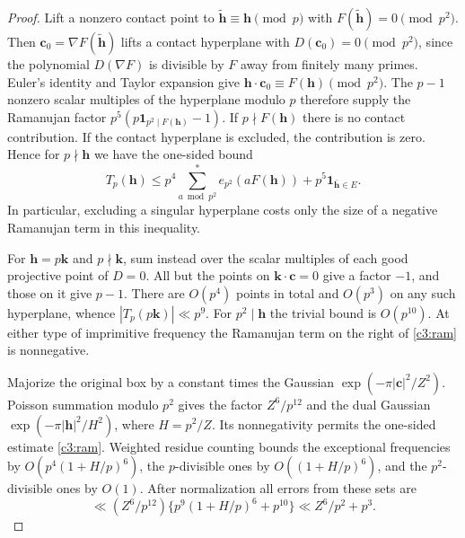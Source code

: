 \documentclass[11pt,letterpaper]{article}
\theoremstyle{definition}
\begin{document}
\begin{proof}
Lift a nonzero contact point to $\tilde{\mathbf h}\equiv\mathbf h\pmod p$
with $F(\tilde{\mathbf h})=0\pmod{p^2}$. Then
$\mathbf c_0=\nabla F(\tilde{\mathbf h})$ lifts a contact hyperplane
with $D(\mathbf c_0)=0\pmod{p^2}$, since the polynomial
$D(\nabla F)$ is divisible by $F$ away from finitely many primes.
Euler's identity and Taylor expansion give
$\mathbf h\cdot\mathbf c_0\equiv F(\mathbf h)\pmod{p^2}$.
The $p-1$ nonzero scalar multiples of the hyperplane modulo $p$
therefore supply the Ramanujan factor
$p^5(p\mathbf1_{p^2\mid F(\mathbf h)}-1)$.
If $p\nmid F(\mathbf h)$ there is no contact contribution. If the
contact hyperplane is excluded, the contribution is zero. Hence for
$p\nmid\mathbf h$ we have the one-sided bound
\begin{equation}\label{c3:ram}
 T_p(\mathbf h)\le
 p^4\sum_{a\bmod p^2}^{*}e_{p^2}(aF(\mathbf h))
  +p^5\mathbf1_{\bar{\mathbf h}\in E}.
\end{equation}
In particular, excluding a singular hyperplane costs only the size of
a negative Ramanujan term in this inequality.

For $\mathbf h=p\mathbf k$ and $p\nmid\mathbf k$, sum instead over the
scalar multiples of each good projective point of $D=0$. All but the
points on $\mathbf k\cdot\mathbf c=0$ give a factor $-1$, and those on
it give $p-1$. There are $O(p^4)$ points in total and $O(p^3)$ on any
such hyperplane, whence $|T_p(p\mathbf k)|\ll p^9$. For
$p^2\mid\mathbf h$ the trivial bound is $O(p^{10})$.
At either type of imprimitive frequency the Ramanujan term on the
right of \eqref{c3:ram} is nonnegative.

Majorize the original box by a constant times the Gaussian
$\exp(-\pi |\mathbf c|^2/Z^2)$. Poisson summation modulo $p^2$ gives
the factor $Z^6/p^{12}$ and the dual Gaussian
$\exp(-\pi |\mathbf h|^2/H^2)$, where $H=p^2/Z$. Its nonnegativity
permits the one-sided estimate \eqref{c3:ram}. Weighted residue counting
bounds the exceptional frequencies by $O(p^4(1+H/p)^6)$, the
$p$-divisible ones by $O((1+H/p)^6)$, and the $p^2$-divisible ones by
$O(1)$. After normalization all errors from these sets are
\[
 \ll (Z^6/p^{12})\{p^9(1+H/p)^6+p^{10}\}
 \ll Z^6/p^2+p^3 .
\]


\end{proof}
\end{document}
